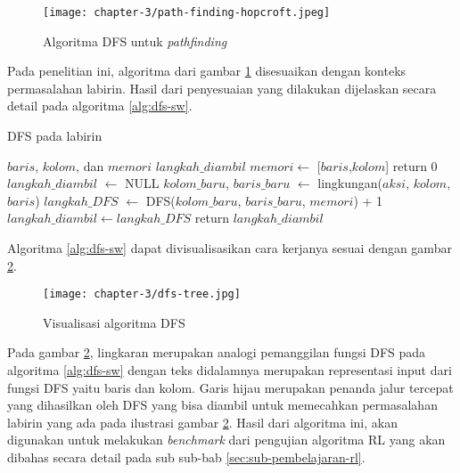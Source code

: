 \begin{figure}[H]
	\centering
	\texttt{[image: chapter-3/path-finding-hopcroft.jpeg]}
	\caption{Algoritma \ac{DFS} untuk \textit{pathfinding} \parencite{hopcroft1973algorithm}}
	\label{fig:hopcroft-dfs}
\end{figure}

Pada penelitian ini, algoritma dari gambar \ref{fig:hopcroft-dfs} disesuaikan dengan konteks permasalahan labirin. Hasil dari penyesuaian yang dilakukan dijelaskan secara detail pada algoritma \ref{alg:dfs-sw}.

\begin{algorithm}
	\makeatletter
	\renewcommand{\ALG@name}{Algoritma}
	\makeatother
	\caption{\ac{DFS} pada labirin}\label{alg:dfs-sw}
	\renewcommand{\algorithmicrequire}{\textbf{Masukan:}}
	\renewcommand{\algorithmicensure}{\textbf{Keluaran:}}
	\begin{algorithmic}[1]
		\Require $baris$, $kolom$, dan $memori$
		\Ensure $langkah\_diambil$
		\State $memori \gets$ [$baris$,$kolom$]
		\State return 0 \EndIf
		\State $langkah\_diambil$ $\gets$ NULL
		\State $kolom\_baru$, $baris\_baru$ $\gets$ lingkungan($aksi$, $kolom$, $baris$)
		\State $langkah\_DFS$ $\gets$ DFS($kolom\_baru$, $baris\_baru$, $memori$) + 1
		\State $langkah\_diambil \gets langkah\_DFS$
		\EndIf
		\EndIf
		\EndFor
		\State return $langkah\_diambil$
	\end{algorithmic}
\end{algorithm}

Algoritma \ref{alg:dfs-sw} dapat divisualisasikan cara kerjanya sesuai dengan gambar \ref{fig:dfs-visualization}.

\begin{figure}[H]
	\centering
	\texttt{[image: chapter-3/dfs-tree.jpg]}
	\caption{Visualisasi algoritma \ac{DFS}}
	\label{fig:dfs-visualization}
\end{figure}

Pada gambar \ref{fig:dfs-visualization}, lingkaran merupakan analogi pemanggilan fungsi \ac{DFS} pada algoritma \ref{alg:dfs-sw} dengan teks didalamnya merupakan representasi input dari fungsi \ac{DFS} yaitu baris dan kolom. Garis hijau merupakan penanda jalur tercepat yang dihasilkan oleh DFS yang bisa diambil untuk memecahkan permasalahan labirin yang ada pada ilustrasi gambar \ref{fig:dfs-visualization}. Hasil dari algoritma ini, akan digunakan untuk melakukan \textit{benchmark} dari pengujian algoritma \ac{RL} yang akan dibahas secara detail pada sub sub-bab \ref{sec:sub-pembelajaran-rl}.

